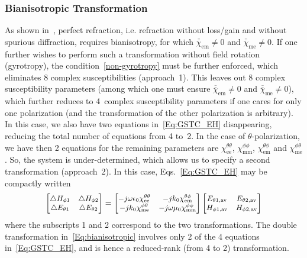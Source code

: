 \documentclass[journal,transaction]{IEEEtran}
\newcommand{\te}[1]{\overline{\overline{#1}}}
\begin{document}
\subsubsection{Bianisotropic Transformation}

As shown in~\cite{GL_perfect_refraction2017}\cite{perfect_refraction2016}, perfect refraction, i.e. refraction without loss/gain and without spurious diffraction, requires bianisotropy, for which $\te{\chi}_\text{em}\neq 0$ and $\te{\chi}_\text{me}\neq 0$. If one further wishes to perform such a transformation without field rotation (gyrotropy), the condition~\eqref{non-gyrotropy} must be further enforced, which eliminates 8 complex susceptibilities (approach~1). This leaves out 8 complex susceptibility parameters (among which one must ensure $\te{\chi}_\text{em}\neq 0$ and $\te{\chi}_\text{me}\neq 0$), which further reduces to 4~complex susceptibility parameters if one cares for only one polarization (and the transformation of the other polarization is arbitrary). In this case, we also have two equations in~\eqref{Eq:GSTC_EH} disappearing, reducing the total number of equations from 4 to~2. In the case of $\theta$-polarization, we have then 2 equations for the remaining parameters are $\chi^{\theta \theta}_\text{ee}$, $\chi^{\phi \phi}_\text{mm}$, $\chi^{\theta \phi}_\text{em}$ and $\chi^{\phi \theta}_\text{me}$. So, the system is under-determined, which allows us to specify a second transformation (approach~2). In this case, Eqs.~\eqref{Eq:GSTC_EH} may be compactly written
%
\begin{equation}\label{Eq:bianisotropic}
\begin{small}
     \begin{bmatrix}
\triangle H_{\phi1}&  \triangle H_{\phi2} \\
\triangle E_{\theta1}&  \triangle E_{\theta2}
  \end{bmatrix}= \begin{bmatrix}
 -j\omega\epsilon_0\chi^{\theta\theta}_\text{ee}& -jk_0\chi^{\theta\phi}_\text{em}\\
-jk_0\chi^{\phi\theta}_\text{me}& -j\omega\mu_0\chi^{\phi\phi}_\text{mm}
  \end{bmatrix}
\begin{bmatrix}
 E_{\theta1,\text{av}}&   E_{\theta2,\text{av}} \\
H_{\phi1,\text{av}}&  H_{\phi2,\text{av}}
  \end{bmatrix}
\end{small}
\end{equation}
%
where the subscripts 1 and 2 correspond to the two transformations. The double transformation in~\eqref{Eq:bianisotropic} involves only 2 of the 4 equations in~\eqref{Eq:GSTC_EH}, and is hence a reduced-rank (from 4 to 2) transformation.
\end{document}
